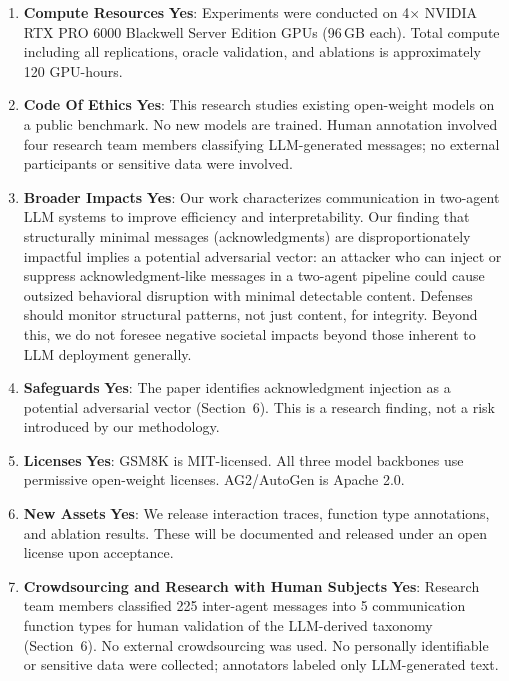 \documentclass{article}
\renewcommand{\answerYes}[1]{\textbf{Yes}: #1}
\begin{document}
\begin{enumerate}
\item {\bf Compute Resources}
    \answerYes{Experiments were conducted on 4$\times$ NVIDIA RTX PRO 6000 Blackwell Server Edition GPUs (96\,GB each). Total compute including all replications, oracle validation, and ablations is approximately 120 GPU-hours.}

\item {\bf Code Of Ethics}
    \answerYes{This research studies existing open-weight models on a public benchmark. No new models are trained. Human annotation involved four research team members classifying LLM-generated messages; no external participants or sensitive data were involved.}

\item {\bf Broader Impacts}
    \answerYes{Our work characterizes communication in two-agent LLM systems to improve efficiency and interpretability. Our finding that structurally minimal messages (acknowledgments) are disproportionately impactful implies a potential adversarial vector: an attacker who can inject or suppress acknowledgment-like messages in a two-agent pipeline could cause outsized behavioral disruption with minimal detectable content. Defenses should monitor structural patterns, not just content, for integrity. Beyond this, we do not foresee negative societal impacts beyond those inherent to LLM deployment generally.}

\item {\bf Safeguards}
    \answerYes{The paper identifies acknowledgment injection as a potential adversarial vector (Section~6). This is a research finding, not a risk introduced by our methodology.}

\item {\bf Licenses}
    \answerYes{GSM8K is MIT-licensed. All three model backbones use permissive open-weight licenses. AG2/AutoGen is Apache 2.0.}

\item {\bf New Assets}
    \answerYes{We release interaction traces, function type annotations, and ablation results. These will be documented and released under an open license upon acceptance.}

\item {\bf Crowdsourcing and Research with Human Subjects}
    \answerYes{Research team members classified 225 inter-agent messages into 5 communication function types for human validation of the LLM-derived taxonomy (Section~6). No external crowdsourcing was used. No personally identifiable or sensitive data were collected; annotators labeled only LLM-generated text.}


\end{enumerate}
\end{document}
